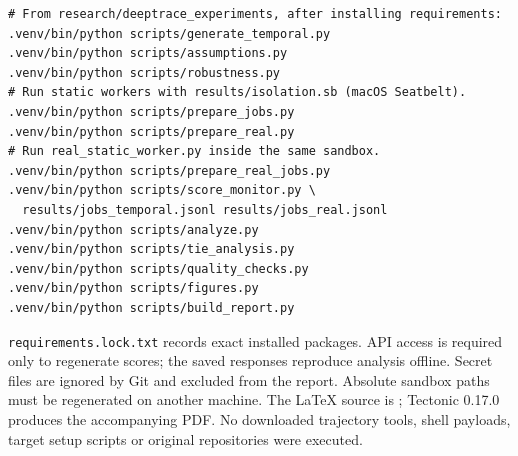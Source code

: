 \documentclass[10pt,letterpaper]{article}
\begin{document}
\begin{verbatim}
# From research/deeptrace_experiments, after installing requirements:
.venv/bin/python scripts/generate_temporal.py
.venv/bin/python scripts/assumptions.py
.venv/bin/python scripts/robustness.py
# Run static workers with results/isolation.sb (macOS Seatbelt).
.venv/bin/python scripts/prepare_jobs.py
.venv/bin/python scripts/prepare_real.py
# Run real_static_worker.py inside the same sandbox.
.venv/bin/python scripts/prepare_real_jobs.py
.venv/bin/python scripts/score_monitor.py \
  results/jobs_temporal.jsonl results/jobs_real.jsonl
.venv/bin/python scripts/analyze.py
.venv/bin/python scripts/tie_analysis.py
.venv/bin/python scripts/quality_checks.py
.venv/bin/python scripts/figures.py
.venv/bin/python scripts/build_report.py
\end{verbatim}

\texttt{requirements.lock.txt} records exact installed packages. API access is required only to regenerate scores; the saved responses reproduce analysis offline. Secret files are ignored by Git and excluded from the report. Absolute sandbox paths must be regenerated on another machine. The LaTeX source is ; Tectonic 0.17.0 produces the accompanying PDF. No downloaded trajectory tools, shell payloads, target setup scripts or original repositories were executed.

\clearpage
\end{document}
